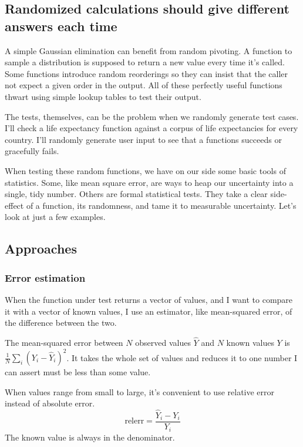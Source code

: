 \documentclass[fleqn,10pt]{olplainarticle}
\begin{document}
\subsection{Randomized calculations should give different answers each time}

A simple Gaussian elimination can benefit from random pivoting.
A function to sample a distribution is supposed to return a new value
every time it's called.
Some functions introduce random reorderings
so they can insist that the caller not expect a given order
in the output. All of these perfectly useful functions
thwart using simple lookup tables to test their output.

The tests, themselves, can be the problem when we randomly
generate test cases. I'll check
a life expectancy function against a corpus of life expectancies
for every country. I'll randomly generate user input
to see that a functions succeeds or gracefully fails.

When testing these random functions,
we have on our side some basic tools
of statistics. Some, like mean square error, are ways
to heap our uncertainty into a single, tidy number.
Others are formal statistical
tests. They take a clear side-effect of a function,
its randomness, and tame it to measurable uncertainty.
Let's look at just a few examples.

\subsection{Approaches}

\subsubsection{Error estimation}
When the function under test returns a vector of values,
and I want to compare it with a vector of known values,
I use an estimator, like mean-squared error, of the difference
between the two.

The mean-squared error between $N$ observed values $\hat{Y}$ and $N$ known values $Y$ is $\frac{1}{N}\sum_i (Y_i - \hat{Y}_i)^2$.
It takes the whole set of values and reduces it to one number I can assert must be less than some value.

When values range from small to large, it's convenient to use
relative error instead of absolute error.
\begin{equation}
  \mbox{relerr} = \frac{\hat{Y}_i - Y_i}{Y_i}
\end{equation}
The known value is always in the denominator.
\end{document}
